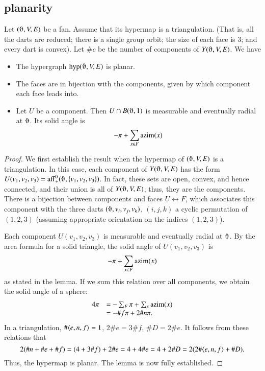\subsection{planarity}

\begin{lemma}\label{lemma:tri-tri}  Let $(\orgn,V,E)$ be a fan.  Assume
that its hypermap is a triangulation. (That is, all the darts are reduced; there is a single group orbit; the size of each face is $3$; and every dart is
convex).   
Let $\#c$ be the number
of components of $Y(\orgn,V,E)$.  We have
    \begin{itemize}
    \item The hypergraph $\op{hyp}(\orgn,V,E)$ is planar.
    \item The faces are in bijection with the components, given by which
    component each face leads into.
        \item Let $U$ be a component. Then $U \cap B(\orgn,1)$ 
       is measurable and eventually radial at $\orgn$.  Its solid angle is
        $$-\pi + \sum_{x\in F} {\operatorname{azim}}(x)$$
    \end{itemize}
\end{lemma}

\begin{proof}
We first establish the result when the hypermap
of $(\orgn,V,E)$ is a triangulation.  
In this case, each component 
of $Y(\orgn,V,E)$ has
the form $U(v_1,v_2,v_3)=\op{aff}_+^0(\orgn,\{v_1,v_2,v_3\})$.  In fact,
these sets are open, convex, and hence connected, 
and their union is all of $Y(\orgn,V,E)$; thus,
they are the components.   There is a bijection
between components and faces $U \leftrightarrow F$, which associates this component
with the three darts $(\orgn,v_i,v_j,v_k)$, $(i,j,k)$ a cyclic permutation
of $(1,2,3)$  (assuming appropriate orientation on the indices $(1,2,3)$).

Each component $U(v_1,v_2,v_3)$ is measurable and eventually radial
at $\orgn$.  By the area formula for a solid triangle, the solid angle of $U(v_1,v_2,v_3)$
is 
   $$-\pi + \sum_{x\in F} {\operatorname{azim}}(x)$$
as stated in the lemma.  If we sum this relation over all components, we obtain
the solid angle of a sphere:
   \begin{equation}\label{eqn:euler}
   \begin{array}{lll}
   4\pi &= -\sum_{F} \pi + \sum_{x} {\operatorname{azim}}(x)\\
        &= -\#f \pi + 2 \# n \pi.
   \end{array}
   \end{equation}
In a triangulation, $\#\langle e,n,f\rangle=1$, $2 \# e  = 3\#f$, $\# D = 2 \#e$.
It follows from these relations that
   $$
   2(\#n + \# e + \# f) = (4 + 3\#f) + 2\#e = 4 + 4\# e = 4 + 2 \# D = 2(2\#\langle e,n,f\rangle+\# D).
   $$
Thus, the hypermap is planar.  The lemma is now fully established.
\end{proof}

